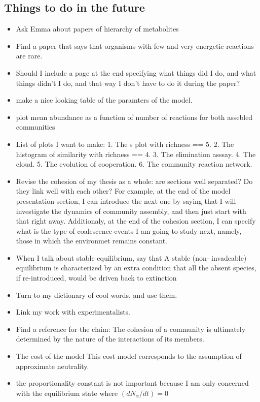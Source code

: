 \documentclass[titlepage,11pt]{article}
\begin{document}
\begin{linenumbers}
\begin{singlespace}
\section{Things to do in the future}
\begin{itemize}
	\item Ask Emma about papers of hierarchy of metabolites
	\item Find a paper that says that organisms with few and very energetic reactions are rare.
	\item Should I include a page at the end specifying what things did I do, and what things didn't I do, and that way I don't have to do it during the paper?
	\item make a nice looking table of the paramters of the model.
	\item plot mean abundance as a function of number of reactions for both assebled communities 
	\item List of plots I want to make: 1. The s plot with richness == 5. 2. The histogram of similarity with richness == 4. 3. The elimination asssay. 4. The cloud. 5. The evolution of cooperation. 6. The community reaction network. 
	\item Revise the cohesion of my thesis as a whole: are sections well separated? Do they link well with each other? For example, at the end of the model presentation section, I can introduce the next one by saying that I will investigate the dynamics of community assembly, and then just start with that right away. Additionaly, at the end of the cohesion section, I can specify what is the type of coalescence events I am going to study next, namely, those in which the environmet remains constant.
	\item When I talk about stable equilibrium, say that A stable (non- invadeable) equilibrium is characterized by an extra condition that all the absent species, if re-introduced, would be driven back to extinction
	\item Turn to my dictionary of cool words, and use them.
	\item Link my work with experimentalists.
	\item Find a reference for the claim: The cohesion of a community is ultimately determined by the nature of the interactions of its members.
	\item The cost of the model This cost model corresponds to the assumption of approximate neutrality.
	\item the proportionality constant is not important because I am only concerned with the equilibrium state where $ (dN_{\alpha}/dt) = 0 $

\end{itemize}
\end{singlespace}
\end{linenumbers}
\end{document}
